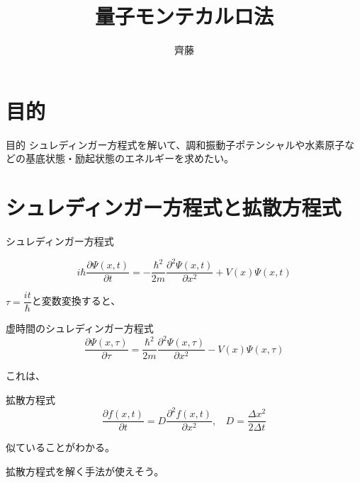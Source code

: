\documentclass[dvipdfmx]{beamer}
\title{量子モンテカルロ法}
\author{齊藤}
\begin{document}
\maketitle
\frame{\tableofcontents[hideallsubsections]}

\section{目的}
\begin{frame}{目的}
    シュレディンガー方程式を解いて、調和振動子ポテンシャルや水素原子などの基底状態・励起状態のエネルギーを求めたい。

\end{frame}

    \section{シュレディンガー方程式と拡散方程式}

    \begin{frame}
      \begin{block}{シュレディンガー方程式}

        \begin{equation}
            i\hbar\dfrac{\partial \Psi(x,t)}{\partial t} = -\dfrac{\hbar^2}{2m}\dfrac{\partial^2 \Psi(x,t)}{\partial x^2} + V(x)\Psi(x,t)
        \end{equation}

      \end{block}

        $\tau = \dfrac{it}{\hbar}$と変数変換すると、

        \begin{block}{虚時間のシュレディンガー方程式}
            \begin{equation}
                \label{tmp1}
        \dfrac{\partial \Psi(x,\tau)}{\partial \tau} = \dfrac{\hbar^2}{2m}\dfrac{\partial^2 \Psi(x,\tau)}{\partial x^2} - V(x)\Psi(x,\tau)
            \end{equation}
        \end{block}
        これは、
        \begin{block}{拡散方程式}
            \begin{equation}
                \dfrac{\partial f(x,t)}{\partial t} = D \dfrac{\partial^2 f(x,t)}{\partial x^2}
                ,~~~~D = \frac{\Delta x^2}{2\Delta t}
            \end{equation}
        \end{block}
        似ていることがわかる。

        \alert{拡散方程式を解く手法が使えそう。}
    \end{frame}
\end{document}
